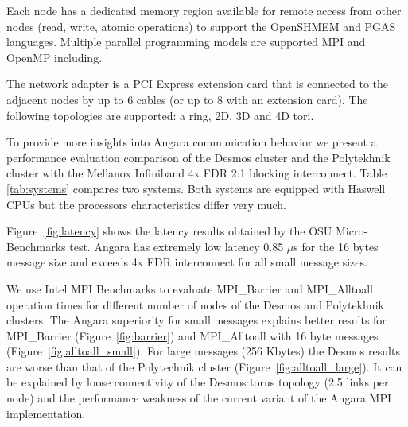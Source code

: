 \documentclass{llncs}
\begin{document}
Each node has a dedicated memory region available for remote access from other nodes (read, write, atomic operations) to support the OpenSHMEM and PGAS languages. Multiple parallel programming models are supported MPI and OpenMP including.

The network adapter is a PCI Express extension card that is connected to the adjacent nodes by up to 6 cables (or up to 8 with an extension card). The following topologies are supported: a ring, 2D, 3D and 4D tori. 

To provide more insights into Angara communication behavior we present a performance evaluation comparison of the Desmos cluster and the Polytekhnik cluster with the Mellanox Infiniband 4x FDR 2:1 blocking interconnect. Table \ref{tab:systems} compares two systems. Both systems are equipped with Haswell CPUs but the processors characteristics differ very much. 

Figure~\ref{fig:latency} shows the latency results obtained by the OSU Micro-Benchmarks test. Angara has extremely low latency 0.85 $\mu$s for the 16 bytes message size and exceeds 4x FDR interconnect for all small message sizes.

We use Intel MPI Benchmarks to evaluate MPI\_Barrier and MPI\_Alltoall operation times for different number of nodes of the Desmos and Polytekhnik clusters. The Angara superiority for small messages explains better results for MPI\_Barrier (Figure~\ref{fig:barrier}) and MPI\_Alltoall with 16 byte messages (Figure~\ref{fig:alltoall_small}). For large messages (256 Kbytes) the Desmos results are worse than that of the Polytechnik cluster (Figure~\ref{fig:alltoall_large}). It can be explained by loose connectivity of the Desmos torus topology (2.5 links per node) and the performance weakness of the current variant of the Angara MPI implementation.
\end{document}
